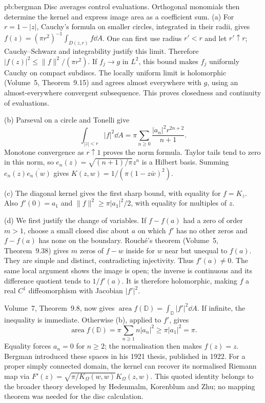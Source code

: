 \begin{solution}{pb:bergman}
\idea Disc averages control evaluations. Orthogonal monomials then determine the kernel and express image area as a coefficient sum.
\writeup (a) For $r=1-|z|$, Cauchy's formula on smaller circles, integrated in their radii, gives $f(z)=(\pi r^2)^{-1}\int_{D(z,r)}f\dd A$. One can first use radius $r'<r$ and let $r'\uparrow r$; Cauchy--Schwarz and integrability justify this limit. Therefore $|f(z)|^2\le\|f\|^2/(\pi r^2)$. If $f_j\to g$ in $L^2$, this bound makes $f_j$ uniformly Cauchy on compact subdiscs. The locally uniform limit is holomorphic (Volume~5, Theorem~9.15) and agrees almost everywhere with $g$, using an almost-everywhere convergent subsequence. This proves closedness and continuity of evaluations.

(b) Parseval on a circle and Tonelli give
\[\int_{|z|<r}|f|^2\dd A=\pi\sum_{n\ge0}\frac{|a_n|^2r^{2n+2}}{n+1}.
\]
Monotone convergence as $r\uparrow1$ proves the norm formula. Taylor tails tend to zero in this norm, so $e_n(z)=\sqrt{(n+1)/\pi}z^n$ is a Hilbert basis. Summing $e_n(z)\overline{e_n(w)}$ gives $K(z,w)=1/(\pi(1-z\bar w)^2)$.

(c) The diagonal kernel gives the first sharp bound, with equality for $f=K_z$. Also $f'(0)=a_1$ and $\|f\|^2\ge\pi|a_1|^2/2$, with equality for multiples of $z$.

(d) We first justify the change of variables. If $f-f(a)$ had a zero of order $m>1$, choose a small closed disc about $a$ on which $f'$ has no other zeros and $f-f(a)$ has none on the boundary. Rouch\'e's theorem (Volume~5, Theorem~9.38) gives $m$ zeros of $f-w$ inside for $w$ near but unequal to $f(a)$. They are simple and distinct, contradicting injectivity. Thus $f'(a)\ne0$. The same local argument shows the image is open; the inverse is continuous and its difference quotient tends to $1/f'(a)$. It is therefore holomorphic, making $f$ a real $C^1$ diffeomorphism with Jacobian $|f'|^2$.

Volume~7, Theorem~9.8, now gives $\operatorname{area}f(\mathbb D)=\int_{\mathbb D}|f'|^2\dd A$. If infinite, the inequality is immediate. Otherwise (b), applied to $f'$, gives
\[\operatorname{area}f(\mathbb D)=\pi\sum_{n\ge1}n|a_n|^2\ge\pi|a_1|^2=\pi.
\]
Equality forces $a_n=0$ for $n\ge2$; the normalisation then makes $f(z)=z$.
\leads Bergman introduced these spaces in his 1921 thesis, published in 1922. For a proper simply connected domain, the kernel can recover its normalised Riemann map via $F'(z)=\sqrt{\pi/K_\Omega(w,w)}K_\Omega(z,w)$. This quoted identity belongs to the broader theory developed by Hedenmalm, Korenblum and Zhu; no mapping theorem was needed for the disc calculation.
\end{solution}

